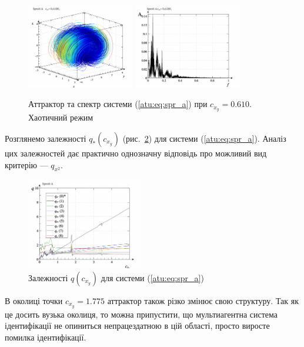 \documentclass[a4paper,13pt]{atuaref}
\begin{document}
\begin{figure}[htb!]
\centerline{
  \includegraphics[width=0.42\textwidth]{p5/p/cha/spr_a/sprott_a-p_xyz_cx_y=0x610.png}
  \includegraphics[width=0.42\textwidth]{p5/p/cha/spr_a/sprott_a_f-p_f_cx_y=0x610.png}
}
\caption{Аттрактор та спектр системи (\ref{atu:eq:spr_a}) при $ c_{x_y} =0.610 $.
  Хаотичний режим
}
\label{atu:f:spr_a_p_0610}
\end{figure}

Розглянемо залежності $q_{*}(c_{x_y}) $ (рис.~\ref{atu:f:spr_a_q})
для системи (\ref{atu:eq:spr_a}). Аналіз цих залежностей дає практично
однозначну відповідь про можливий вид критерію --- $ q_{x^2} $.

\begin{figure}[htb!]
\centerline{
  \includegraphics[width=0.45\textwidth]{p5/p/cha/spr_a/sprott_a_q-p_c_x_y.png}
}
\caption{Залежності $q(c_{x_y})$ для системи (\ref{atu:eq:spr_a}) }
\label{atu:f:spr_a_q}
\end{figure}

В околиці точки $ c_ {x_y} = 1.775 $ аттрактор також різко змінює свою
структуру. Так як це досить вузька околиця, то можна припустити, що
мультиагентна система ідентифікації не опиниться непрацездатною в цій області,
просто виросте помилка ідентифікації.
\end{document}

